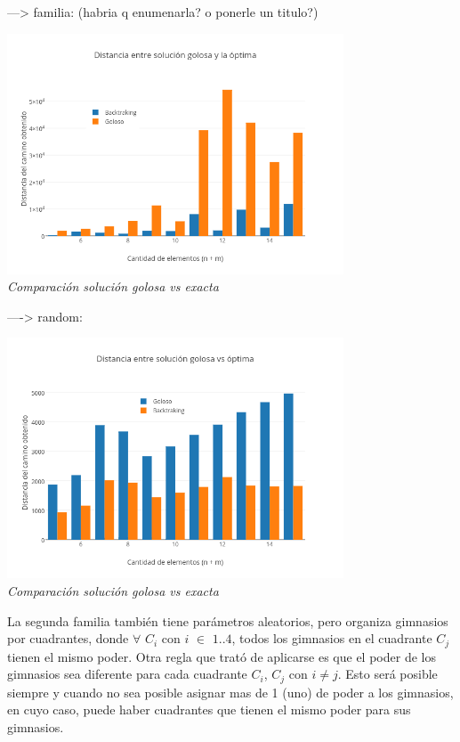 ---> familia: (habria q enumenarla? o ponerle un titulo?)
\vspace*{0.3cm} \vspace*{0.3cm}
  \begin{center}
 \includegraphics[width=0.75\textwidth]{./EJ2/familiaDif.png}
\\{\textit{Comparación solución golosa vs exacta}}
  \end{center}
----> random:

\vspace*{0.3cm} \vspace*{0.3cm}
  \begin{center}
 \includegraphics[width=0.75\textwidth]{./EJ2/random.png}
\\{\textit{Comparación solución golosa vs exacta}}
  \end{center}
La segunda familia también tiene parámetros aleatorios, pero organiza gimnasios por cuadrantes, donde $\forall$ $C_i$ con $i$ $\in$ ${1..4}$, todos los gimnasios en el cuadrante $C_j$ tienen el mismo poder. Otra regla que trató de aplicarse es que el poder de los gimnasios sea diferente para cada cuadrante $C_i$, $C_j$ con $i \neq j$. Esto será posible siempre y cuando no sea posible asignar mas de 1 (uno) de poder a los gimnasios, en cuyo caso, puede haber cuadrantes que tienen el mismo poder para sus gimnasios.

